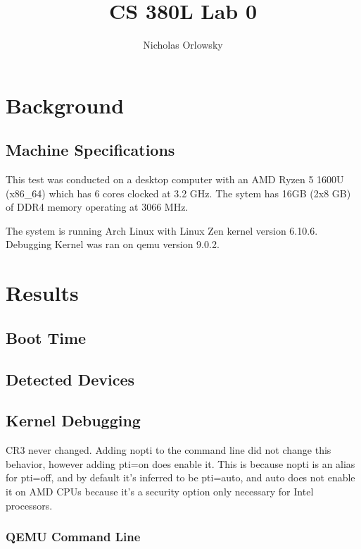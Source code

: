 \usepackage{listings}


\title{CS 380L Lab 0}
\author{Nicholas Orlowsky}
\maketitle

\section{Background}

\subsection{Machine Specifications}

This test was conducted on a desktop computer with an AMD Ryzen 5 1600U (x86_64) which 
has 6 cores clocked at 3.2 GHz. The sytem has 16GB (2x8 GB) of DDR4 memory operating at 
3066 MHz.

The system is running Arch Linux with Linux Zen kernel version 6.10.6. Debugging Kernel 
was ran on qemu version 9.0.2.

\section{Results}

\subsection{Boot Time}

\subsection{Detected Devices} 

\subsection{Kernel Debugging}

CR3 never changed. Adding nopti to the command line did not change this behavior, however 
adding pti=on does enable it. This is because nopti is an alias for pti=off, and by default 
it's inferred to be pti=auto, and auto does not enable it on AMD CPUs because it's a security 
option only necessary for Intel processors.

\subsubsection{QEMU Command Line}

